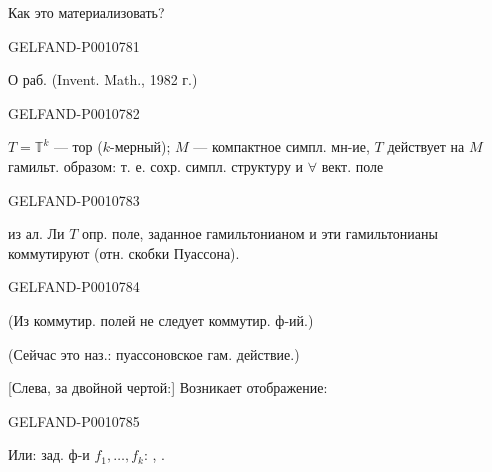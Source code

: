Как это материализовать?


\begin{GelfandAdjacentEvidence}{GELFAND-P001078}{1}

О раб.  (Invent. Math., 1982 г.)
\end{GelfandAdjacentEvidence}
\begin{GelfandAdjacentEvidence}{GELFAND-P001078}{2}


$T=\mathbb T^k$ — тор ($k$-мерный); $M$ — компактное симпл. мн-ие,
$T$ действует на $M$ гамильт. образом: т. е. сохр. симпл. структуру и $\forall$ вект. поле
\end{GelfandAdjacentEvidence}
\begin{GelfandAdjacentEvidence}{GELFAND-P001078}{3}

из ал. Ли $T$ опр. поле, заданное гамильтонианом и эти гамильтонианы коммутируют (отн. скобки Пуассона).
\end{GelfandAdjacentEvidence}
\begin{GelfandAdjacentEvidence}{GELFAND-P001078}{4}


(Из коммутир. полей не следует коммутир. ф-ий.)

(Сейчас это наз.: пуассоновское гам. действие.)

[Слева, за двойной чертой:] Возникает отображение:
\end{GelfandAdjacentEvidence}
\begin{GelfandAdjacentEvidence}{GELFAND-P001078}{5}


Или: зад. ф-и $f_1,\ldots,f_k$: , .
\end{GelfandAdjacentEvidence}
